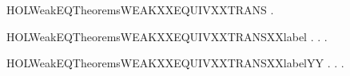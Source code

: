 \newcommand{\HOLWeakEQTheoremsWEAKXXEQUIVXXSYMYY}{\UseVerbatim{HOLWeakEQTheoremsWEAKXXEQUIVXXSYMYY}}
\begin{SaveVerbatim}{HOLWeakEQTheoremsWEAKXXEQUIVXXTRANS}
\HOLTokenTurnstile{} \HOLSymConst{\HOLTokenForall{}}  .
          \HOLSymConst{\HOLTokenConj{}}    \HOLSymConst{\HOLTokenImp{}}   
\end{SaveVerbatim}
\newcommand{\HOLWeakEQTheoremsWEAKXXEQUIVXXTRANS}{\UseVerbatim{HOLWeakEQTheoremsWEAKXXEQUIVXXTRANS}}
\begin{SaveVerbatim}{HOLWeakEQTheoremsWEAKXXEQUIVXXTRANSXXlabel}
\HOLTokenTurnstile{} \HOLSymConst{\HOLTokenForall{}} .
          \HOLSymConst{\HOLTokenImp{}}
       \HOLSymConst{\HOLTokenForall{}} .
            \HOLTokenTransBegin{} \HOLTokenTransEnd {} \HOLSymConst{\HOLTokenImp{}}
           \HOLSymConst{\HOLTokenExists{}}.  \HOLTokenWeakTransBegin{} \HOLTokenWeakTransEnd {} \HOLSymConst{\HOLTokenConj{}}   
\end{SaveVerbatim}
\newcommand{\HOLWeakEQTheoremsWEAKXXEQUIVXXTRANSXXlabel}{\UseVerbatim{HOLWeakEQTheoremsWEAKXXEQUIVXXTRANSXXlabel}}
\begin{SaveVerbatim}{HOLWeakEQTheoremsWEAKXXEQUIVXXTRANSXXlabelYY}
\HOLTokenTurnstile{} \HOLSymConst{\HOLTokenForall{}} .
          \HOLSymConst{\HOLTokenImp{}}
       \HOLSymConst{\HOLTokenForall{}} .
            \HOLTokenTransBegin{} \HOLTokenTransEnd {} \HOLSymConst{\HOLTokenImp{}}
           \HOLSymConst{\HOLTokenExists{}}.  \HOLTokenWeakTransBegin{} \HOLTokenWeakTransEnd {} \HOLSymConst{\HOLTokenConj{}}   
\end{SaveVerbatim}
